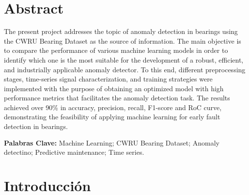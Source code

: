 \documentclass[11pt,a4paper,spanish]{book}
\numberwithin{equation}{chapter}
\numberwithin{figure}{chapter}
\begin{document}
\chapter{Abstract}
The present project addresses the topic of anomaly detection in bearings using the CWRU
Bearing Dataset as the source of information. The main objective is to compare the 
performance of various machine learning models in order to identify which one is the most
suitable for the development of a robust, efficient, and industrially applicable anomaly
detector. To this end, different preprocessing stages, time-series signal characterization,
and training strategies were implemented with the purpose of obtaining an optimized model
with high performance metrics that facilitates the anomaly detection task. The results 
achieved over 90\% in accuracy, precision, recall, F1-score and RoC curve, demonstrating
the feasibility of applying machine learning for early fault detection in bearings.

{\bf Palabras Clave:} Machine Learning; CWRU Bearing Dataset; Anomaly detectino;
Predictive maintenance; Time series.




\mainmatter
\chapter{Introducción}



\end{document}
